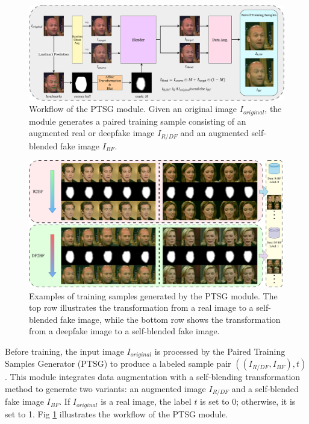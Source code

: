 \documentclass[final,5p,times]{elsarticle}
\begin{document}
\begin{figure}[htb]
\centering
\includegraphics[width=1.0\linewidth]{images/Fig4.pdf}
\caption{Workflow of the PTSG module. Given an original image $I_{original}$, the module generates a paired training sample consisting of an augmented real or deepfake image $I_{R/DF}$ and an augmented self-blended fake image $I_{BF}$.} 
\label{Fig4}
\end{figure}

\begin{figure}[htb]
\centering
\includegraphics[width=1.0\linewidth]{images/Fig5.pdf}
\caption{Examples of training samples generated by the PTSG module. The top row illustrates the transformation from a real image to a self-blended fake image, while the bottom row shows the transformation from a deepfake image to a self-blended fake image.} 
\label{Fig5}
\end{figure}

Before training, the input image $I_{original}$ is processed by the Paired Training Samples Generator (PTSG) to produce a labeled sample pair $((I_{R/DF},I_{BF}),t)$. This module integrates data augmentation with a self-blending transformation method \cite{18} to generate two variants: an augmented image $I_{R/DF}$ and a self-blended fake image $I_{BF}$. If $I_{original}$ is a real image, the label $t$ is set to 0; otherwise, it is set to 1. Fig \ref{Fig4} illustrates the workflow of the PTSG module.
\end{document}
